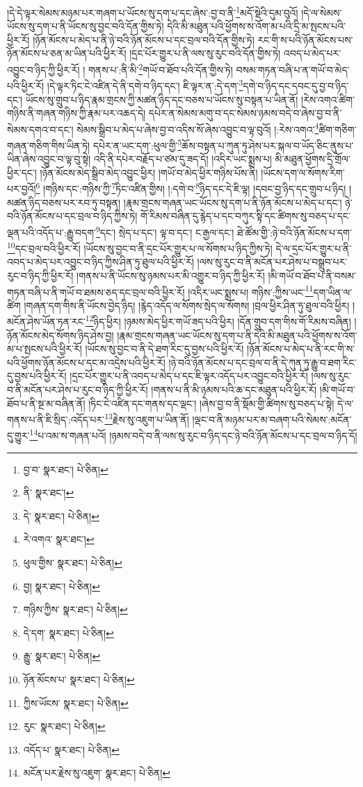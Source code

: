 །དེ་དེ་ལྟར་སེམས་མཉམ་པར་གཞག་པ་ཡོངས་སུ་དག་པ་དང་ཞེས་:བྱ་བ་ནི་\footnote{བྱ་བ་  སྣར་ཐང་།  པེ་ཅིན། }མདོ་སྡེའི་དུམ་བུའོ། །དེ་ལ་སེམས་ཡོངས་སུ་དག་པ་ནི་ཡོངས་སུ་བྱང་བའི་དོན་གྱིས་ཏེ། དེའི་མི་མཐུན་པའི་ཕྱོགས་ས་འོག་མ་པའི་དྲི་མ་སྤངས་པའི་ཕྱིར་རོ། །ཉོན་མོངས་པ་མེད་པ་ནི་ཉེ་བའི་ཉོན་མོངས་པ་དང་བྲལ་བའི་དོན་གྱིས་ཏེ། རང་གི་ས་པའི་ཉོན་མོངས་པས་ཉོན་མོངས་པ་ཅན་མ་ཡིན་པའི་ཕྱིར་རོ། །དྲང་པོར་གྱུར་པ་ནི་ལས་སུ་རུང་བའི་དོན་གྱིས་ཏེ། འབད་པ་མེད་པར་འབྱུང་བ་ཉིད་ཀྱི་ཕྱིར་རོ། །
གནས་པ་:ནི་མི་\footnote{ནི་  སྣར་ཐང་། }གཡོ་བ་ཐོབ་པའི་དོན་གྱིས་ཏེ། བསམ་གཏན་བཞི་པ་ན་གཡོ་བ་མེད་པའི་ཕྱིར་རོ། །དེ་ལྟར་ཏིང་ངེ་འཛིན་དེ་ནི་དགེ་བ་ཉིད་དང་། ཇི་ལྟར་ན་:དེ་དག་\footnote{དེ་  སྣར་ཐང་།  པེ་ཅིན། }དགེ་བ་ཉིད་དང་དབང་དུ་བྱ་བ་ཉིད་དང་། ཡོངས་སུ་གྲུབ་པ་ཉིད་རྣམ་གྲངས་ཀྱི་མཚན་ཉིད་དང་བཅས་པ་ཡོངས་སུ་བསྟན་པ་ཡིན་ནོ། །རེས་འགའ་ཚིག་གཉིས་ནི་གཞན་གཉིས་ཀྱི་རྣམ་པར་འཆད་དེ། དཔེར་ན་སེམས་མགུ་བ་དང་སེམས་ཉམས་བདེ་བ་ཞེས་བྱ་བ་ནི་སེམས་དགའ་བ་དང་། སེམས་སྒྲིབ་པ་མེད་པ་ཞེས་བྱ་བ་འདིས་སོ་ཞེས་འབྱུང་བ་ལྟ་བུའོ། །:རེས་འགའ་\footnote{རེ་འགའ་  སྣར་ཐང་། }ཚིག་གཅིག་གཞན་གཅིག་གིས་ཡིན་ཏེ། དཔེར་ན་ཡང་དག་:ཕུལ་གྱི་\footnote{ཕུལ་གྱིས་  སྣར་ཐང་།  པེ་ཅིན། }ཆོས་བསྟན་པ་ཀུན་ཏུ་ཤེས་པར་སྐལ་བ་ཡོད་ཅིང་ནུས་པ་ཡིན་ཞེས་འབྱུང་བ་ལྟ་བུ་སྟེ། འདི་ནི་དཔེར་བརྗོད་པ་ཙམ་དུ་ཟད་དོ། །འདིར་ཡང་སྨྲས་པ། མི་མཐུན་ཕྱོགས་དྲི་གྲོལ་ཕྱིར་དང་། །ཉོན་མོངས་མེད་སྒྲིབ་མེད་འབྱུང་ཕྱིར། །གཡོ་བ་མེད་ཕྱིར་གཉིས་པོས་ནི། །ཡོངས་དག་ལ་སོགས་རིག་པར་བྱའོ།\footnote{བྱ།  སྣར་ཐང་།  པེ་ཅིན། } །གཉིས་དང་:གཉིས་ཀྱི་\footnote{གཉིས་ཀྱིས་  སྣར་ཐང་།  པེ་ཅིན། }ཏིང་འཛིན་གྱིས། །:དགེ་བ་\footnote{དེ་དག་  སྣར་ཐང་།  པེ་ཅིན། }ཉིད་དང་དེ་ཇི་ལྟ། །དབང་བྱ་ཉིད་དང་གྲུབ་པ་ཉིད། །མཚན་ཉིད་བཅས་པར་རབ་ཏུ་བསྟན། །རྣམ་གྲངས་གཞན་ཡང་ཡོངས་སུ་དག་པ་ནི་ཉོན་མོངས་པ་མེད་པ་དང་། ཉེ་བའི་ཉོན་མོངས་པ་དང་བྲལ་བ་ཉིད་ཀྱིས་ཏེ། གོ་རིམས་བཞིན་དུ་རྙེད་པ་དང་བཀུར་སྟི་དང་ཚིགས་སུ་བཅད་པ་དང་ལྡན་པའི་འདོད་པ་:རྒྱུ་བདག་\footnote{རྒྱུ་  སྣར་ཐང་།  པེ་ཅིན། }དང་། སྲེད་པ་དང་། ལྟ་བ་དང་། ང་རྒྱལ་དང་། ཐེ་ཚོམ་གྱི་:ཉེ་བའི་ཉོན་མོངས་པ་དག་\footnote{ཉོན་མོངས་པ་  སྣར་ཐང་།  པེ་ཅིན། }དང་བྲལ་བའི་ཕྱིར་རོ། །ཡོངས་སུ་བྱང་བ་ནི་དྲང་པོར་གྱུར་པ་ལ་སོགས་པ་ཉིད་ཀྱིས་ཏེ། དེ་ལ་དྲང་པོར་གྱུར་པ་ནི་འབད་པ་མེད་པར་འབྱུང་བ་ཉིད་ཀྱིས་ཤིན་ཏུ་ཐུལ་པའི་ཕྱིར་རོ། །ལས་སུ་རུང་བ་ནི་མངོན་པར་ཤེས་པ་བསྒྲུབ་པར་རུང་བ་ཉིད་ཀྱི་ཕྱིར་རོ། །གནས་པ་ནི་ཡོངས་སུ་ཉམས་པར་མི་འགྱུར་བ་ཉིད་ཀྱི་ཕྱིར་རོ། །མི་གཡོ་བ་ཐོབ་པ་ནི་བསམ་གཏན་བཞི་པ་ནི་གཡོ་བ་ཐམས་ཅད་དང་བྲལ་བའི་ཕྱིར་རོ། །འདིར་ཡང་སྨྲས་པ། གཉིས་:ཀྱིས་ཡང་\footnote{ཀྱིས་ཡོངས་  སྣར་ཐང་།  པེ་ཅིན། }དག་ཡིན་ལ་ཚིག །གཞན་དག་གིས་ནི་ཡོངས་བྱེད་ཉིད། །རྙེད་འདོད་ལ་སོགས་སྲེད་ལ་སོགས། །བྲལ་ཕྱིར་ཤིན་ཏུ་ཐུལ་བའི་ཕྱིར། །མངོན་ཤེས་ཡོན་ཏན་རང་\footnote{རུང་  སྣར་ཐང་།  པེ་ཅིན། }ཉིད་ཕྱིར། །ཉམས་མེད་ཕྱིར་གཡོ་ཟད་པའི་ཕྱིར། །དོན་གྲུབ་དག་གིས་གོ་རིམས་བཞིན། །ཉོན་མོངས་མེད་སོགས་ཉིད་ཤེས་བྱ། །རྣམ་གྲངས་གཞན་ཡང་ཡོངས་སུ་དག་པ་ནི་དེའི་མི་མཐུན་པའི་ཕྱོགས་ས་འོག་མ་པ་སྤངས་པའི་ཕྱིར་རོ། །ཡོངས་སུ་བྱང་བ་ནི་དེ་ཐག་རིང་དུ་བྱས་པའི་ཕྱིར་རོ། །ཉོན་མོངས་པ་མེད་པ་ནི་རང་གི་ས་པའི་ཕྱོགས་ཉོན་མོངས་པ་དང་མ་འདྲེས་པའི་ཕྱིར་རོ། །ཉེ་བའི་ཉོན་མོངས་པ་དང་བྲལ་བ་ནི་དེ་ཀུན་ཏུ་རྒྱུ་བ་ཐག་རིང་དུ་བྱས་པའི་ཕྱིར་རོ། །དྲང་པོར་གྱུར་པ་ནི་འབད་པ་མེད་པ་དང་ཇི་ལྟར་འདོད་པར་འབྱུང་བའི་ཕྱིར་རོ། །ལས་སུ་རུང་བ་ནི་མངོན་པར་ཤེས་པ་རུང་བ་ཉིད་ཀྱི་ཕྱིར་རོ། །གནས་པ་ནི་མི་ཉམས་པའི་ཆ་དང་མཐུན་པའི་ཕྱིར་རོ། །མི་གཡོ་བ་ཐོབ་པ་ནི་སྔ་མ་བཞིན་ནོ། །ཏིང་ངེ་འཛིན་དང་གནས་དང་ལྡང་། །ཞེས་བྱ་བ་ནི་སྡོམ་གྱི་ཚིགས་སུ་བཅད་པ་སྟེ། དེ་ལ་གནས་པ་ནི་ཇི་སྲིད་:འདོད་པར་\footnote{འདོད་པ་  སྣར་ཐང་།  པེ་ཅིན། }རྗེས་སུ་འཇུག་པ་ཡིན་ནོ། །ལྡང་བ་ནི་མཉམ་པར་མ་བཞག་པའི་སེམས་:མངོན་དུ་གྱུར་\footnote{མངོན་པར་རྗེས་སུ་འཇུག་  སྣར་ཐང་།  པེ་ཅིན། }པ་འམ་ས་གཞན་པའོ། །ཉམས་བདེ་བ་ནི་ལས་སུ་རུང་བ་ཉིད་དང་ཉེ་བའི་ཉོན་མོངས་པ་དང་བྲལ་བ་ཉིད་དོ། 